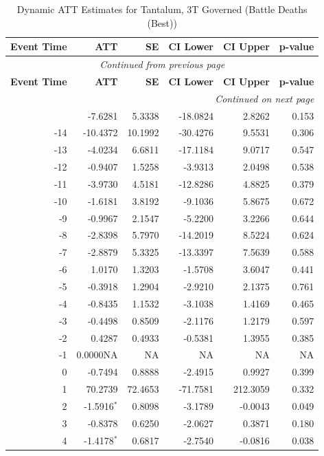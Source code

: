 \begin{longtable}{rrrrrr}
\caption{Dynamic ATT Estimates for Tantalum, 3T Governed (Battle Deaths (Best))} \label{tab:tantalum_battle_deaths_best_} \\
\toprule
\textbf{Event Time} & \textbf{ATT} & \textbf{SE} & \textbf{CI Lower} & \textbf{CI Upper} & \textbf{p-value} \\
\midrule
\endfirsthead
\multicolumn{6}{c}{\textit{Continued from previous page}} \\
\toprule
\textbf{Event Time} & \textbf{ATT} & \textbf{SE} & \textbf{CI Lower} & \textbf{CI Upper} & \textbf{p-value} \\
\midrule
\endhead
\midrule \multicolumn{6}{r}{\textit{Continued on next page}} \\
\endfoot
\bottomrule
\endlastfoot
-15 & -7.6281 & 5.3338 & -18.0824 & 2.8262 & 0.153 \\
-14 & -10.4372 & 10.1992 & -30.4276 & 9.5531 & 0.306 \\
-13 & -4.0234 & 6.6811 & -17.1184 & 9.0717 & 0.547 \\
-12 & -0.9407 & 1.5258 & -3.9313 & 2.0498 & 0.538 \\
-11 & -3.9730 & 4.5181 & -12.8286 & 4.8825 & 0.379 \\
-10 & -1.6181 & 3.8192 & -9.1036 & 5.8675 & 0.672 \\
-9 & -0.9967 & 2.1547 & -5.2200 & 3.2266 & 0.644 \\
-8 & -2.8398 & 5.7970 & -14.2019 & 8.5224 & 0.624 \\
-7 & -2.8879 & 5.3325 & -13.3397 & 7.5639 & 0.588 \\
-6 & 1.0170 & 1.3203 & -1.5708 & 3.6047 & 0.441 \\
-5 & -0.3918 & 1.2904 & -2.9210 & 2.1375 & 0.761 \\
-4 & -0.8435 & 1.1532 & -3.1038 & 1.4169 & 0.465 \\
-3 & -0.4498 & 0.8509 & -2.1176 & 1.2179 & 0.597 \\
-2 & 0.4287 & 0.4933 & -0.5381 & 1.3955 & 0.385 \\
-1 & 0.0000NA & NA & NA & NA & NA \\
0 & -0.7494 & 0.8888 & -2.4915 & 0.9927 & 0.399 \\
1 & 70.2739 & 72.4653 & -71.7581 & 212.3059 & 0.332 \\
2 & -1.5916$^{*}$ & 0.8098 & -3.1789 & -0.0043 & 0.049 \\
3 & -0.8378 & 0.6250 & -2.0627 & 0.3871 & 0.180 \\
4 & -1.4178$^{*}$ & 0.6817 & -2.7540 & -0.0816 & 0.038 \\

\end{longtable}
